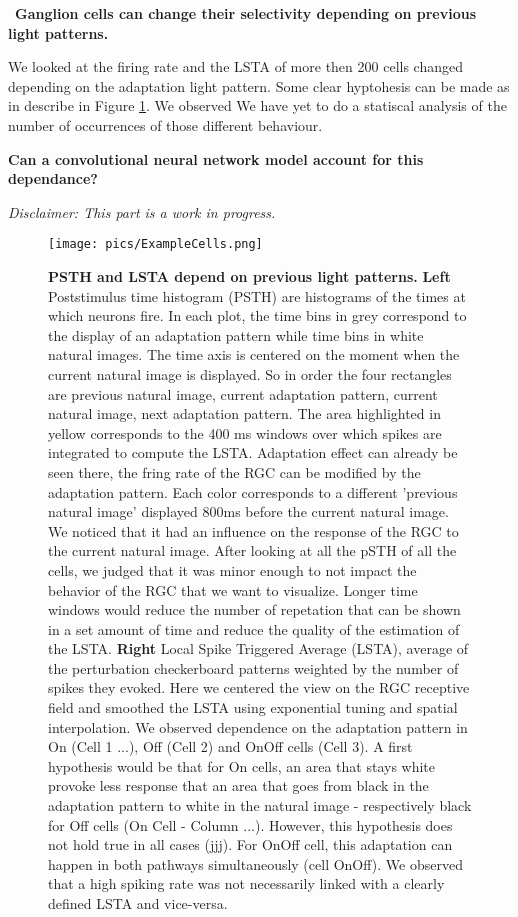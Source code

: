 \par~\textbf{Ganglion cells can change their selectivity depending on previous
    light patterns.}

We looked at the firing rate and the LSTA of more then 200 cells changed
depending on the adaptation light pattern. Some clear hyptohesis can be made as
in describe in Figure \ref{fig:CellExample}. We observed We have yet to do a
statiscal analysis of the number of occurrences of those different behaviour.

\textbf{Can a convolutional neural network model account for this dependance?}

\textit{Disclaimer: This part is a work in progress.}

\begin{figure}
    \centering
    \texttt{[image: pics/ExampleCells.png]}
    \caption{\textbf{PSTH and LSTA depend on previous light patterns.} \textbf{Left} Poststimulus time histogram (PSTH) are histograms of the times at which neurons fire. In each plot, the time bins in grey correspond to the display of an adaptation pattern while time bins in white natural images.
        The time axis is centered on the moment when the current natural image is displayed. So in order the four rectangles are previous natural image, current adaptation pattern, current natural image, next adaptation pattern. The area highlighted in yellow corresponds to the 400 ms windows over which spikes are integrated to compute the LSTA. Adaptation effect can already be seen there, the fring rate of the RGC can be modified by the adaptation pattern.
        Each color corresponds to a different 'previous natural image' displayed 800ms before the current natural image. We noticed that it had an influence on the response of the RGC to the current natural image. After looking at all the pSTH of all the cells, we judged that it was minor enough to not impact the behavior of the RGC that we want to visualize. Longer time windows would reduce the number of repetation that can be shown in a set amount of time and reduce the quality of the estimation of the LSTA.
        \textbf{Right} Local Spike Triggered Average (LSTA), average of the perturbation checkerboard patterns weighted by the number of spikes they evoked. Here we centered the view on the RGC receptive field and smoothed the LSTA using exponential tuning and spatial interpolation. We observed dependence on the adaptation pattern in On (Cell 1 ...), Off (Cell 2) and OnOff cells (Cell 3). A first hypothesis would be that for On cells, an area that stays white provoke less response that an area that goes from black in the adaptation pattern to white in the natural image - respectively black for Off cells (On Cell - Column ...).
        However, this hypothesis does not hold true in all cases (jjj). For OnOff cell, this adaptation can happen in both pathways simultaneously (cell OnOff). We observed that a high spiking rate was not necessarily linked with a clearly defined LSTA and vice-versa. }
    \label{fig:CellExample}
\end{figure}